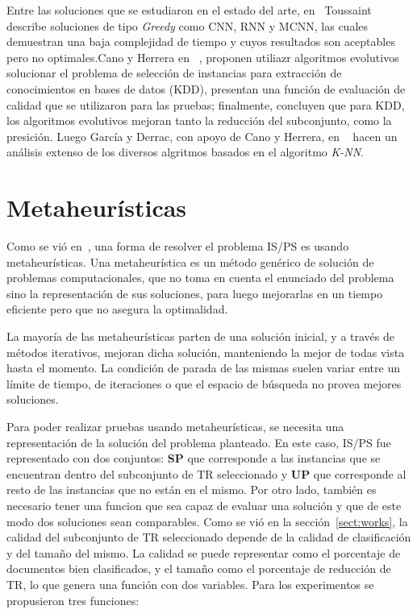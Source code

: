 \documentclass{ci5652}
\begin{document}
Entre las soluciones que se estudiaron en el estado del arte, en~\cite{toussaint2002proximity} Toussaint describe soluciones de tipo \textit{Greedy} como CNN, RNN y MCNN, las cuales demuestran una baja complejidad de tiempo y cuyos resultados son aceptables pero no optimales.Cano y Herrera en ~\cite{1255391}, proponen utiliazr algoritmos evolutivos solucionar el problema de selección de instancias para extracción de conocimientos en bases de datos (KDD), presentan una función de evaluación de calidad que se utilizaron para las pruebas; finalmente, concluyen que para KDD, los algoritmos evolutivos mejoran tanto la reducción del subconjunto, como la presición. Luego García y Derrac, con apoyo de Cano y Herrera, en ~\cite{garcia2012prototype} hacen un análisis extenso de los diversos algritmos basados en el algoritmo \textit{K-NN}. 

\section{Metaheurísticas}
\label{sect:meta}

Como se vió en~\cite{1255391}, una forma de resolver el problema IS/PS es usando metaheurísticas. Una metaheurística es un método genérico de solución de problemas computacionales, que no toma en cuenta el enunciado del problema sino la representación de sus soluciones, para luego mejorarlas en un tiempo eficiente pero que no asegura la optimalidad.

La mayoría de las metaheurísticas parten de una solución inicial, y a través de métodos iterativos, mejoran dicha solución, manteniendo la mejor de todas vista hasta el momento. La condición de parada de las mismas suelen variar entre un límite de tiempo, de iteraciones o que el espacio de búsqueda no provea mejores soluciones.

Para poder realizar pruebas usando metaheurísticas, se necesita una representación de la solución del problema planteado. En este caso, IS/PS fue representado con dos conjuntos: \textbf{SP} que corresponde a las instancias que se encuentran dentro del subconjunto de TR seleccionado y \textbf{UP} que corresponde al resto de las instancias que no están en el mismo. Por otro lado, también es necesario tener una funcion que sea capaz de evaluar una solución y que de este modo dos soluciones sean comparables. Como se vió en la sección~\ref{sect:works}, la calidad del subconjunto de TR seleccionado depende de la calidad de clasificación y del tamaño del mismo. La calidad se puede representar como el porcentaje de documentos bien clasificados, y el tamaño como el porcentaje de reducción de TR, lo que genera una función con dos variables. Para los experimentos se propusieron tres funciones:
\end{document}
